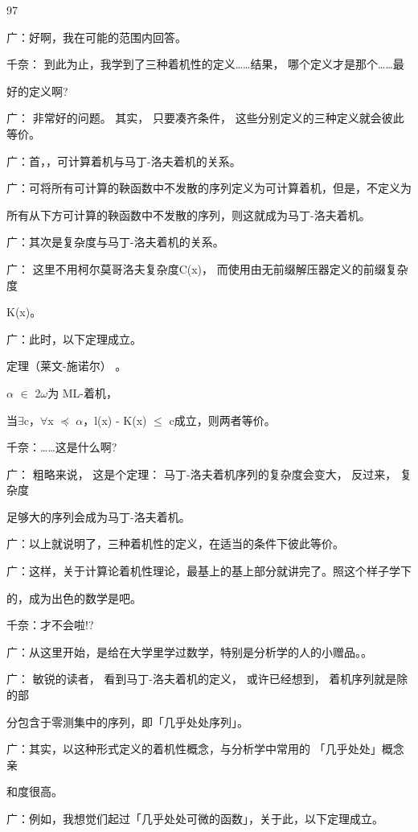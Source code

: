 97\par
广：好啊，我在可能的范围内回答。\par
千奈： 到此为止，我学到了三种着机性的定义……结果， 哪个定义才是那个……最\par
好的定义啊?\par
广： 非常好的问题。 其实， 只要凑齐条件， 这些分别定义的三种定义就会彼此等价。\par
广：首，，可计算着机与马丁-洛夫着机的关系。\par
广：可将所有可计算的鞅函数中不发散的序列定义为可计算着机，但是，不定义为\par
所有从下方可计算的鞅函数中不发散的序列，则这就成为马丁-洛夫着机。\par
广：其次是复杂度与马丁-洛夫着机的关系。\par
广： 这里不用柯尔莫哥洛夫复杂度C(x)， 而使用由无前缀解压器定义的前缀复杂度\par
K(x)。\par
广：此时，以下定理成立。\par
定理（莱文-施诺尔） 。\par
$\alpha$ $\in$ 2$\omega$为 ML-着机，\par
当$\exists$c，$\forall$x $\preceq$ $\alpha$，l(x) - K(x) $\leq$ c成立，则两者等价。\par
千奈：……这是什么啊?\par
广： 粗略来说， 这是个定理： 马丁-洛夫着机序列的复杂度会变大， 反过来， 复杂度\par
足够大的序列会成为马丁-洛夫着机。\par
广：以上就说明了，三种着机性的定义，在适当的条件下彼此等价。\par
广：这样，关于计算论着机性理论，最基上的基上部分就讲完了。照这个样子学下\par
的，成为出色的数学是吧。\par
千奈：才不会啦!?\par
广：从这里开始，是给在大学里学过数学，特别是分析学的人的小赠品。。\par
广： 敏锐的读者， 看到马丁-洛夫着机的定义， 或许已经想到， 着机序列就是除的部\par
分包含于零测集中的序列，即「几乎处处序列」。\par
广：其实，以这种形式定义的着机性概念，与分析学中常用的 「几乎处处」概念亲\par
和度很高。\par
广：例如，我想觉们起过「几乎处处可微的函数」，关于此，以下定理成立。\par

